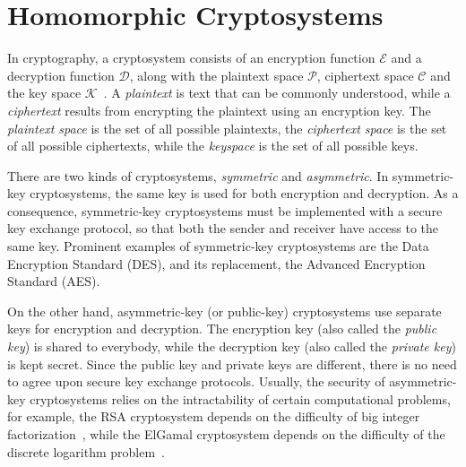 \section{Homomorphic Cryptosystems}

In cryptography, a cryptosystem consists of an encryption function $\mathcal{E}$ and a decryption function $\mathcal{D}$, along with the plaintext space $\mathcal{P}$, ciphertext space $\mathcal{C}$ and the key space $\mathcal{K}$~\cite{bauer_cryptosystem_2005}. A \textit{plaintext} is text that can be commonly understood, while a \textit{ciphertext} results from encrypting the plaintext using an encryption key. The \textit{plaintext space} is the set of all possible plaintexts, the \textit{ciphertext space} is the set of all possible ciphertexts, while the \textit{keyspace} is the set of all possible keys.

There are two kinds of cryptosystems, \textit{symmetric} and \textit{asymmetric}. In symmetric-key cryptosystems, the same key is used for both encryption and decryption. As a consequence, symmetric-key cryptosystems must be implemented with a secure key exchange protocol, so that both the sender and receiver have access to the same key. Prominent examples of symmetric-key cryptosystems are the Data Encryption Standard (DES), and its replacement, the Advanced Encryption Standard (AES).

On the other hand, asymmetric-key (or public-key) cryptosystems use separate keys for encryption and decryption. The encryption key (also called the \textit{public key}) is shared to everybody, while the decryption key (also called the \textit{private key}) is kept secret. Since the public key and private keys are different, there is no need to agree upon secure key exchange protocols. Usually, the security of asymmetric-key cryptosystems relies on the intractability of certain computational problems, for example, the RSA cryptosystem depends on the difficulty of big integer factorization~\cite{rivest_method_1978}, while the ElGamal cryptosystem depends on the difficulty of the discrete logarithm problem~\cite{blakley_public_1985}.

